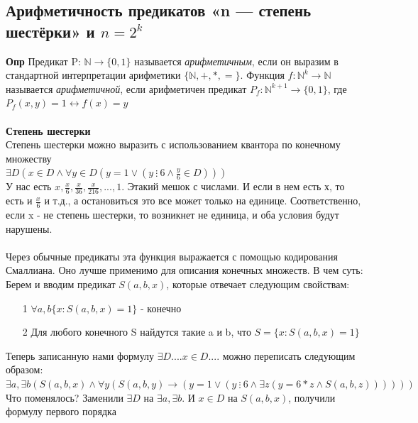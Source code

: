 \setcounter{subsection}{8}

\subsection{Арифметичность предикатов «n — степень шестёрки» и $n = 2^k$}

\textbf{Опр} Предикат P: $\mathbb {N} \rightarrow \{0,1\}$ называется \textit{арифметичным}, если он выразим в стандартной интерпретации арифметики $\{\mathbb {N}, +,*,=\}$. Функция $f: \mathbb{N}^k \rightarrow \mathbb{N}$ называется \textit{арифметичной}, если арифметичен предикат $P_{f}: \mathbb{N}^{k+1} \rightarrow \{0,1\}$, где $P_f(x,y) = 1 \leftrightarrow f(x) = y$
\\
\\
\textbf{Степень шестерки}
\\
Степень шестерки можно выразить с использованием квантора по конечному множеству\\
    $\exists D (x \in D \wedge \forall y \in D (y = 1 \vee (y \ \vdots \ 6 \wedge \frac{y}{6} \in D)))$ \\ У нас есть $x, \frac{x}{6}, \frac{x}{36}, \frac{x}{216}, ..., 1$. Этакий мешок с числами. И если в нем есть х, то есть и $\frac{x}{6}$ и т.д., а остановиться это все может только на единице. Соответственно, если x - не степень шестерки, то возникнет не единица, и оба условия будут нарушены.
    \\
    \\
    Через обычные предикаты эта функция выражается с помощью кодирования Смаллиана. Оно лучше применимо для описания конечных множеств. В чем суть:
    \\
    Берем и вводим предикат $S(a,b,x)$, которые отвечает следующим свойствам:
    \begin{itemize}
        \item [1] $\forall a,b\{x: S(a,b,x) = 1\}$ - конечно
        \item[2] Для любого конечного S найдутся такие a и b, что $S = \{x: S(a,b,x) = 1\}$
    \end{itemize}
    Теперь записанную нами формулу $\exists D .... x \in D....$ можно переписать следующим образом:\\
    $\exists a,\exists b (S(a,b,x) \wedge \forall y(S(a,b,y) \rightarrow (y = 1 \vee(y \ \vdots \ 6 \wedge \exists z(y = 6*z \wedge S(a,b,z))))))$ \\
    Что поменялось? Заменили $\exists D$ на $\exists a, \exists b$. И $x \in D$ на $S(a,b,x)$, получили формулу первого порядка\\\\
